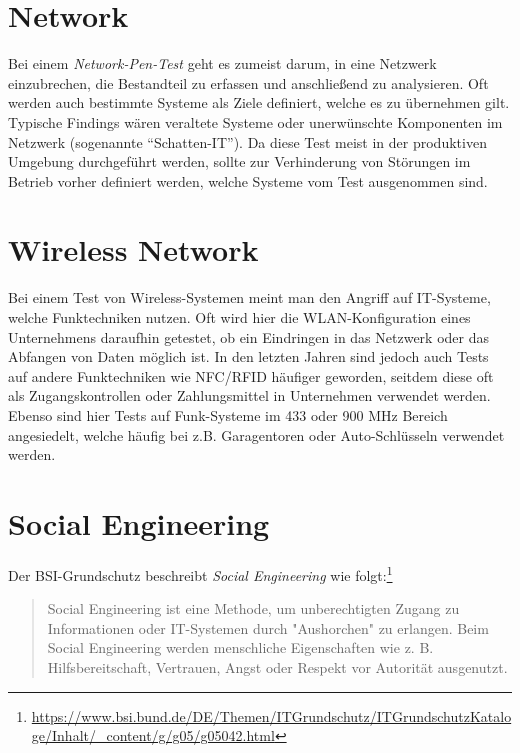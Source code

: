 	\section{Network}
	Bei einem \textit{Network-Pen-Test} geht es zumeist darum, in eine Netzwerk einzubrechen, die Bestandteil zu erfassen und anschließend zu analysieren. Oft werden auch bestimmte Systeme als Ziele definiert, welche es zu übernehmen gilt. Typische Findings wären veraltete Systeme oder unerwünschte Komponenten im Netzwerk (sogenannte "`Schatten-IT"'). Da diese Test meist in der produktiven Umgebung durchgeführt werden, sollte zur Verhinderung von Störungen im Betrieb vorher definiert werden, welche Systeme vom Test ausgenommen sind.
	
	
	\section{Wireless Network}
	Bei einem Test von Wireless-Systemen meint man den Angriff auf IT-Systeme, welche Funktechniken nutzen. Oft wird hier die  WLAN-Konfiguration eines Unternehmens daraufhin getestet, ob ein Eindringen in das Netzwerk oder das Abfangen von Daten möglich ist. In den letzten Jahren sind jedoch auch Tests auf andere Funktechniken wie NFC/RFID häufiger geworden, seitdem diese oft als Zugangskontrollen oder Zahlungsmittel in Unternehmen verwendet werden. Ebenso sind hier Tests auf Funk-Systeme im 433 oder 900 MHz Bereich angesiedelt, welche häufig bei z.B. Garagentoren oder Auto-Schlüsseln verwendet werden.
	
	\section{Social Engineering}
	Der BSI-Grundschutz beschreibt \textit{Social Engineering} wie folgt:\footnote{\url{https://www.bsi.bund.de/DE/Themen/ITGrundschutz/ITGrundschutzKataloge/Inhalt/_content/g/g05/g05042.html}}
	\begin{quote}
Social Engineering ist eine Methode, um unberechtigten Zugang zu Informationen oder IT-Systemen durch "Aushorchen" zu erlangen. Beim Social Engineering werden menschliche Eigenschaften wie z. B. Hilfsbereitschaft, Vertrauen, Angst oder Respekt vor Autorität ausgenutzt. 
	\end{quote}

